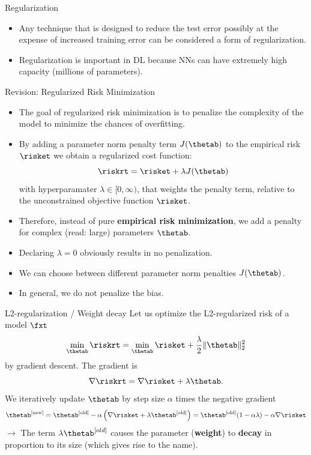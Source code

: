 







\begin{frame} {Regularization}
\begin{itemize}
\item Any technique that is designed to reduce the test error possibly at the expense of increased training error can be considered a form of regularization.
\item Regularization is important in DL because NNs can have extremely high capacity (millions of parameters).
\end{itemize}
\end{frame}

\begin{vbframe}{Revision: Regularized Risk Minimization}
\begin{itemize}
\item The goal of regularized risk minimization is to penalize the complexity of the model to minimize the chances of overfitting.
\item By adding a parameter norm penalty term \(J(\thetab)\) to the empirical risk $\risket$ we obtain a regularized cost function:
$$\riskrt = \risket + \lambda \text{\(J(\thetab)\)}$$
with hyperparamater $\lambda \in [0, \infty)$, that weights the penalty term, relative to the unconstrained objective function $\risket$.
\item Therefore, instead of pure \textbf{empirical risk minimization}, we add a penalty
for complex (read: large) parameters \(\thetab\).
\item Declaring $\lambda = 0$ obviously results in no penalization.
\item We can choose between different parameter norm penalties \(J(\thetab)\).
\item In general, we do not penalize the bias.
\end{itemize}
\end{vbframe}

\begin{vbframe}{L2-regularization / Weight decay}
Let us optimize the L2-regularized risk of a model $\fxt$
\[\min_{\thetab} \riskrt = \min_{\thetab} \risket + \frac{\lambda}{2} \|\thetab\|^2_2\]
by gradient descent. The gradient is
\[\nabla \riskrt = \nabla \risket + \lambda \thetab.\]
We iteratively update $\thetab$ by step size \(\alpha\) times the
negative gradient
\[\thetab^{[\text{new}]} = \thetab^{[\text{old}]} - \alpha \left(\nabla \risket + \lambda \thetab^{[\text{old}]}\right) =
\thetab^{[\text{old}]} (1 - \alpha \lambda) - \alpha \nabla \risket\]
$\to$ The term \(\lambda \thetab^{[old]}\) causes the parameter
(\textbf{weight}) to \textbf{decay} in proportion to its size (which gives rise to the name). 
\end{vbframe}

